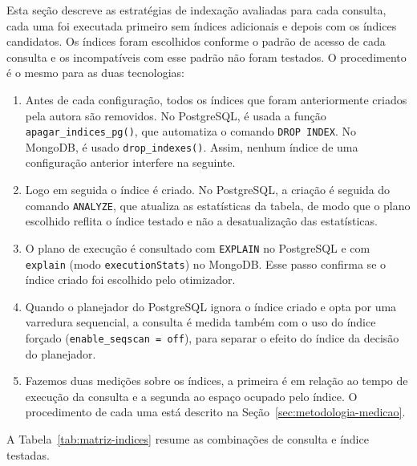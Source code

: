 Esta seção descreve as estratégias de indexação avaliadas para cada consulta, 
cada uma foi executada primeiro
sem índices adicionais e depois com os índices candidatos. Os
índices foram escolhidos conforme o padrão de acesso de cada consulta
e os incompatíveis com esse padrão não foram testados. O procedimento 
é o mesmo para as duas tecnologias:

\begin{enumerate}
  \item Antes de cada configuração, todos os índices que foram anteriormente criados pela autora são
  removidos. No PostgreSQL, é usada a função \texttt{apagar\_indices\_pg()},
  que automatiza o comando \texttt{DROP INDEX}. No MongoDB, é usado
  \texttt{drop\_indexes()}. Assim, nenhum índice de uma configuração anterior 
  interfere na seguinte.
  \item Logo em seguida o índice é criado. No PostgreSQL, a criação é seguida do comando \texttt{ANALYZE}, que atualiza as estatísticas da tabela, de modo que o plano escolhido reflita o índice testado e não a desatualização das estatísticas.
  \item O plano de execução é consultado com
  \texttt{EXPLAIN} no PostgreSQL e com \texttt{explain}
  (modo \texttt{executionStats}) no MongoDB. Esse passo confirma se o índice
  criado foi escolhido pelo otimizador.
  \item Quando o planejador do PostgreSQL ignora o índice criado e opta por uma varredura sequencial, a consulta é medida também com o uso do índice forçado (\texttt{enable\_seqscan = off}), para separar o efeito do índice da decisão do planejador.
  \item Fazemos duas medições sobre os índices, a primeira é em relação ao tempo de execução da consulta e a segunda ao espaço ocupado pelo índice. O procedimento de cada uma está descrito na
  Seção~\ref{sec:metodologia-medicao}.

\end{enumerate}


A Tabela~\ref{tab:matriz-indices} resume as combinações de consulta e índice testadas.

